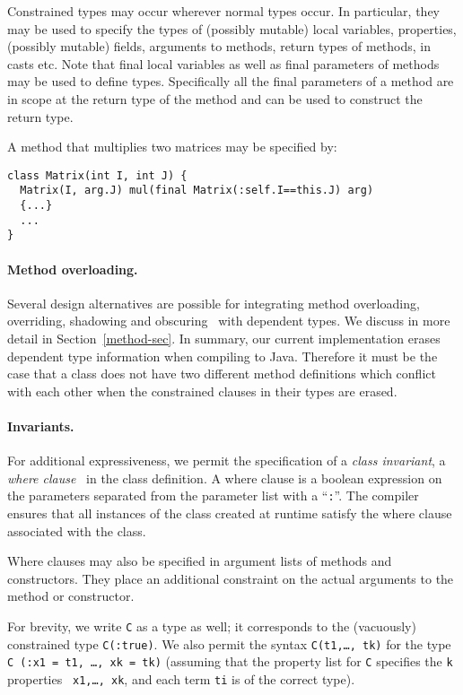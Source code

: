Constrained types may occur wherever normal types occur. In
particular, they may be used to specify the types of (possibly
mutable) local variables, properties, (possibly mutable) fields,
arguments to methods, return types of methods, in casts etc.  Note
that final local variables as well as final parameters of methods may
be used to define types. Specifically all the final parameters of a
method are in scope at the return type of the method and can be used
to construct the return type.

\begin{example}
A method that multiplies two matrices may be specified by:
{\footnotesize
\begin{verbatim}
class Matrix(int I, int J) {
  Matrix(I, arg.J) mul(final Matrix(:self.I==this.J) arg) 
  {...}
  ...
}
\end{verbatim}}

\end{example}
\paragraph{Method overloading.}
Several design alternatives are possible for integrating method
overloading, overriding, shadowing and obscuring~\cite{Java3} with
dependent types. We discuss in more detail in
Section~\ref{method-sec}. In summary, our current implementation
erases dependent type information when compiling to Java. Therefore it
must be the case that a class does not have two different method
definitions which conflict with each other when the constrained
clauses in their types are erased.

\paragraph{Invariants.}
For additional expressiveness, we permit the specification of a {\em
class invariant}, a {\em where clause}~\cite{where-clauses} in the
class definition. A where clause is a boolean expression on the
parameters separated from the parameter list with a ``{\tt :}''.  The
compiler ensures that all instances of the class created at runtime
satisfy the where clause associated with the class.

Where clauses may also be specified in argument lists of methods and
constructors. They place an additional constraint on the actual
arguments to the method or constructor.

For brevity, we write {\tt C} as a type as well; it
corresponds to the (vacuously) constrained type {\tt C(:true)}.
We also permit the syntax {\tt C(t1,\ldots, tk)} for
the type {\tt C (:x1 = t1, \ldots, xk = tk)} (assuming that
the property list for {\tt C} specifies the {\tt k} properties {\tt
x1,\ldots, xk}, and each term {\tt ti} is of the correct
type). 

